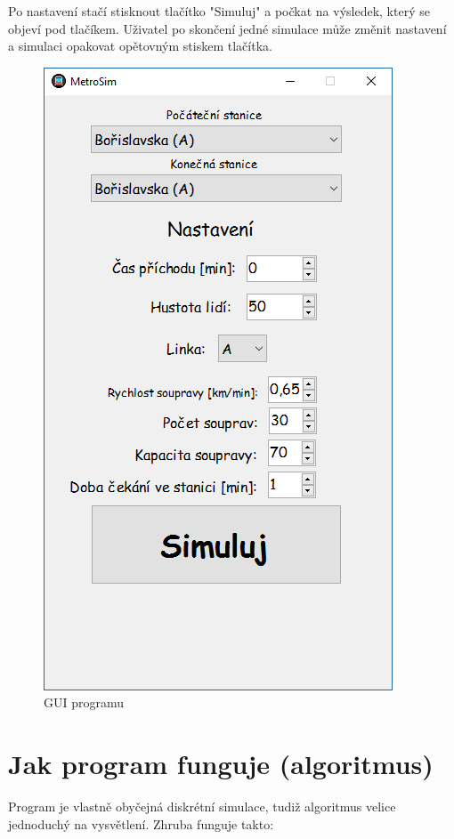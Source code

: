 \documentclass[12pt, a4paper]{article}
\begin{document}
Po nastavení stačí stisknout tlačítko "Simuluj" a počkat na výsledek, který se objeví pod tlačíkem. Uživatel po skončení jedné simulace může změnit nastavení a simulaci opakovat opětovným stiskem tlačítka.
\begin{figure}[h]
\centering
\includegraphics[scale=0.5]{obr1}
\caption{GUI programu}
\end{figure}

\section{Jak program funguje (algoritmus)}

Program je vlastně obyčejná diskrétní simulace, tudiž algoritmus velice jednoduchý na vysvětlení. Zhruba funguje takto:
\end{document}

